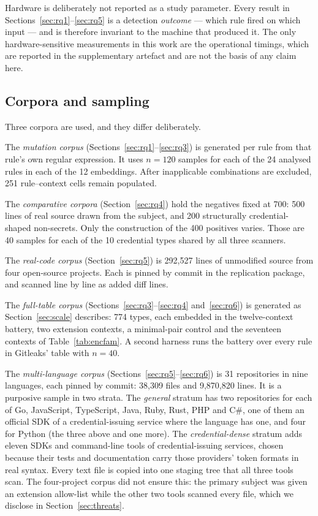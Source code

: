 \documentclass[pdflatex,sn-basic]{sn-jnl}
\begin{document}
Hardware is deliberately not reported as a study parameter. Every result in Sections~\ref{sec:rq1}--\ref{sec:rq5} is a detection \emph{outcome} --- which rule fired on which input --- and is therefore invariant to the machine that produced it. The only hardware-sensitive measurements in this work are the operational timings, which are reported in the supplementary artefact and are not the basis of any claim here.

\subsection{Corpora and sampling}

Three corpora are used, and they differ deliberately.

The \emph{mutation corpus} (Sections~\ref{sec:rq1}--\ref{sec:rq3}) is generated per rule from that rule's own regular expression. It uses $n=120$ samples for each of the 24 analysed rules in each of the 12 embeddings. After inapplicable combinations are excluded, 251 rule--context cells remain populated.

The \emph{comparative corpora} (Section~\ref{sec:rq4}) hold the negatives fixed at 700: 500 lines of real source drawn from the subject, and 200 structurally credential-shaped non-secrets. Only the construction of the 400 positives varies. Those are 40 samples for each of the 10 credential types shared by all three scanners.

The \emph{real-code corpus} (Section~\ref{sec:rq5}) is 292{,}527 lines of unmodified source from four open-source projects. Each is pinned by commit in the replication package, and scanned line by line as added diff lines.

The \emph{full-table corpus} (Sections~\ref{sec:rq3}--\ref{sec:rq4} and~\ref{sec:rq6}) is generated as Section~\ref{sec:scale} describes: 774 types, each embedded in the twelve-context battery, two extension contexts, a minimal-pair control and the seventeen contexts of Table~\ref{tab:encfam}. A second harness runs the battery over every rule in Gitleaks' table with $n=40$.

The \emph{multi-language corpus} (Sections~\ref{sec:rq5}--\ref{sec:rq6}) is 31 repositories in nine languages, each pinned by commit: 38{,}309 files and 9{,}870{,}820 lines. It is a purposive sample in two strata. The \emph{general} stratum has two repositories for each of Go, JavaScript, TypeScript, Java, Ruby, Rust, PHP and C\#, one of them an official SDK of a credential-issuing service where the language has one, and four for Python (the three above and one more). The \emph{credential-dense} stratum adds eleven SDKs and command-line tools of credential-issuing services, chosen because their tests and documentation carry those providers' token formats in real syntax. Every text file is copied into one staging tree that all three tools scan. The four-project corpus did not ensure this: the primary subject was given an extension allow-list while the other two tools scanned every file, which we disclose in Section~\ref{sec:threats}.
\end{document}
